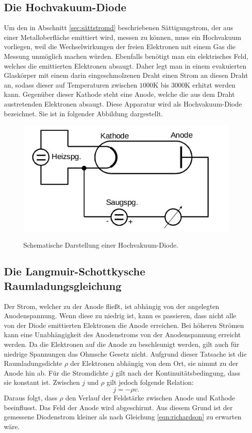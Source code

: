 \subsection{Die Hochvakuum-Diode}
\label{sec:hochvak}
Um den in Abschnitt \ref{sec:sättstromd} beschriebenen Sättigungstrom, der aus
einer Metalloberfläche emittiert wird, messen zu können, muss ein Hochvakuum
vorliegen, weil die Wechselwirkungen der freien Elektronen mit einem Gas die
Messung unmöglich machen würden. Ebenfalls benötigt man ein elektrisches Feld,
welches die emittierten Elektronen absaugt. Daher legt man in einem evakuierten
Glaskörper mit einem darin eingeschmolzenen Draht einen Strom an diesen Draht an,
sodass dieser auf Temperaturen zwischen $1000 \si{\kelvin}$ bis $3000 \si{\kelvin}$
erhitzt werden kann. Gegenüber dieser Kathode steht eine Anode, welche die aus
dem Draht austretenden Elektronen absaugt. Diese Apparatur wird als
Hochvakuum-Diode bezeichnet. Sie ist in folgender Abbildung dargestellt.
\begin{figure}[H]
  \centering
  \includegraphics[scale=0.5]{content/hochvakuumdiode.png}
  \label{fig:hochvakuumd}
  \caption{Schematische Darstellung einer Hochvakuum-Diode.}
\end{figure}
\noindent

\subsection{Die Langmuir-Schottkysche Raumladungsgleichung}
\label{sec:langmuirschottky}
Der Strom, welcher zu der Anode fließt, ist abhängig von der angelegten
Anodenspannung. Wenn diese zu niedrig ist, kann es passieren, dass nicht alle
von der Diode emittierten Elektronen die Anode erreichen. Bei höheren Strömen
kann eine Unabhängigkeit des Anodenstroms von der Anodenspannung erreicht werden.
Da die Elektronen auf die Anode zu beschleunigt werden, gilt auch für niedrige
Spannungen das Ohmsche Gesetz nicht. Aufgrund dieser Tatsache ist die
Raumladungsdichte $\rho$ der Elektronen abhängig von dem Ort, sie nimmt zu der
Anode hin ab. Für die Stromdichte $j$ gilt nach der Kontinuitätsbedingung, dass
sie konstant ist. Zwischen $j$ und $\rho$ gilt jedoch folgende Relation:
\begin{equation}
  j = -\rho v.
  \label{eqn:anodenstromdichte}
\end{equation}
Daraus folgt, dass $\rho$ den Verlauf der Feldstärke zwischen Anode und Kathode
beeinflusst. Das Feld der Anode wird abgeschirmt. Aus diesem Grund ist der
gemessene Diodenstrom kleiner als nach Gleichung \eqref{eqn:richardson} zu
erwarten wäre. 
